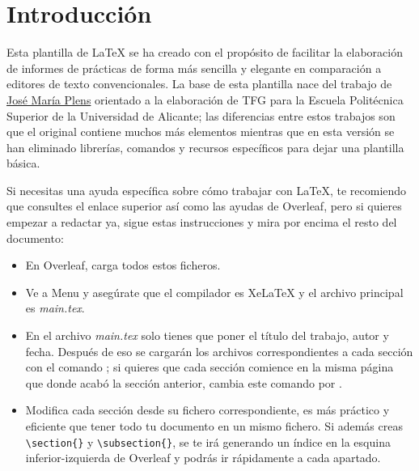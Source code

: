 \section{Introducción}

Esta plantilla de LaTeX se ha creado con el propósito de facilitar la elaboración de informes de prácticas de forma más sencilla y elegante en comparación a editores de texto convencionales. La base de esta plantilla nace del trabajo de \href{https://github.com/jmrplens/TFG-TFM_EPS}{José María Plens} orientado a la elaboración de TFG para la Escuela Politécnica Superior de la Universidad de Alicante; las diferencias entre estos trabajos son que el original contiene muchos más elementos mientras que en esta versión se han eliminado librerías, comandos y recursos específicos para dejar una plantilla básica.

Si necesitas una ayuda específica sobre cómo trabajar con LaTeX, te recomiendo que consultes el enlace superior así como las ayudas de Overleaf, pero si quieres empezar a redactar ya, sigue estas instrucciones y mira por encima el resto del documento:

\begin{itemize}
    \item En Overleaf, carga todos estos ficheros.
    \item Ve a Menu y asegúrate que el compilador es XeLaTeX y el archivo principal es \textit{main.tex}.
    \item En el archivo \textit{main.tex} solo tienes que poner el título del trabajo, autor y fecha. Después de eso se cargarán los archivos correspondientes a cada sección con el comando \verb||; si quieres que cada sección comience en la misma página que donde acabó la sección anterior, cambia este comando por \verb||.
    \item Modifica cada sección desde su fichero correspondiente, es más práctico y eficiente que tener todo tu documento en un mismo fichero. Si además creas \verb|\section{}| y \verb|\subsection{}|, se te irá generando un índice en la esquina inferior-izquierda de Overleaf y podrás ir rápidamente a cada apartado.
\end{itemize}